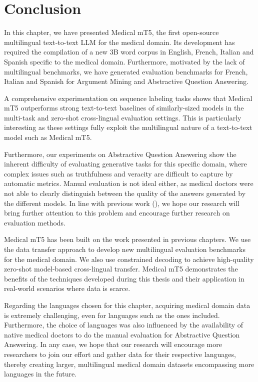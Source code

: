 \section{Conclusion}

In this chapter, we have presented Medical mT5, the first open-source multilingual text-to-text LLM for the medical domain. Its development has required the compilation of a new 3B word corpus in English, French, Italian and Spanish specific to the medical domain. Furthermore, motivated by the lack of multilingual benchmarks, we have generated evaluation benchmarks for French, Italian and Spanish for Argument Mining and Abstractive Question Answering. 

A comprehensive experimentation on sequence labeling tasks shows that Medical mT5 outperforms strong text-to-text baselines of similarly-sized models in the multi-task and zero-shot cross-lingual evaluation settings. This is particularly interesting as these settings fully exploit the multilingual nature of a text-to-text model such as Medical mT5.

Furthermore, our experiments on Abstractive Question Answering show the inherent difficulty of evaluating generative tasks for this specific domain, where complex issues such as truthfulness and veracity are difficult to capture by automatic metrics. Manual evaluation is not ideal either, as medical doctors were not able to clearly distinguish between the quality of the answers generated by the different models. In line with previous work (\cite{singhal-palm}), we hope our research will bring further attention to this problem and encourage further research on evaluation methods.

Medical mT5 has been built on the work presented in previous chapters. We use the data transfer approach to develop new multilingual evaluation benchmarks for the medical domain. We also use constrained decoding to achieve high-quality zero-shot model-based cross-lingual transfer. Medical mT5 demonstrates the benefits of the techniques developed during this thesis and their application in real-world scenarios where data is scarce.

Regarding the languages chosen for this chapter, acquiring medical domain data is extremely challenging, even for languages such as the ones included. Furthermore, the choice of languages was also influenced by the availability of native medical doctors to do the manual evaluation for Abstractive Question Answering. In any case, we hope that our research will encourage more researchers to join our effort and gather data for their respective languages, thereby creating larger, multilingual medical domain datasets encompassing more languages in the future. 